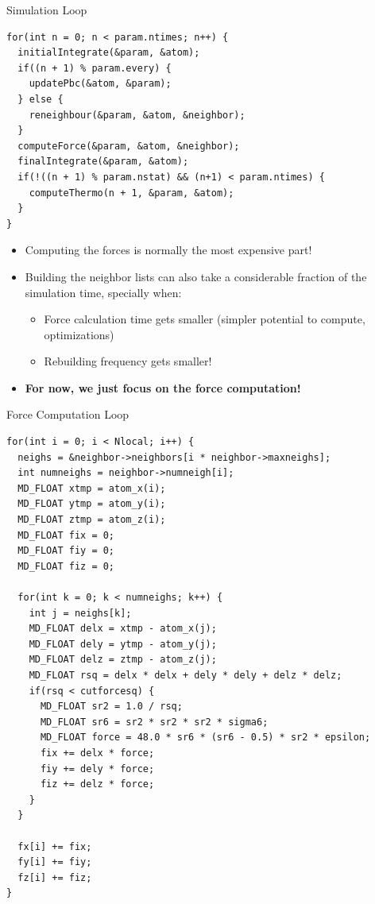 \documentclass[aspectratio=43,t]{beamer}
\begin{document}
  \begin{frame}[fragile]{Simulation Loop}
    \begin{lstlisting}
for(int n = 0; n < param.ntimes; n++) {
  initialIntegrate(&param, &atom);
  if((n + 1) % param.every) {
    updatePbc(&atom, &param);
  } else {
    reneighbour(&param, &atom, &neighbor);
  }
  computeForce(&param, &atom, &neighbor);
  finalIntegrate(&param, &atom);
  if(!((n + 1) % param.nstat) && (n+1) < param.ntimes) {
    computeThermo(n + 1, &param, &atom);
  }
}
    \end{lstlisting}
    \begin{itemize}
      \item Computing the forces is normally the most expensive part!
      \item Building the neighbor lists can also take a considerable fraction of the simulation time, specially when:
      \begin{itemize}
        \item Force calculation time gets smaller (simpler potential to compute, optimizations)
        \item Rebuilding frequency gets smaller!
      \end{itemize}
      \item \textbf{For now, we just focus on the force computation!}
    \end{itemize}
  \end{frame}

  \begin{frame}[fragile]{Force Computation Loop}
    \begin{lstlisting}[basicstyle=\tt\tiny]
for(int i = 0; i < Nlocal; i++) {
  neighs = &neighbor->neighbors[i * neighbor->maxneighs];
  int numneighs = neighbor->numneigh[i];
  MD_FLOAT xtmp = atom_x(i);
  MD_FLOAT ytmp = atom_y(i);
  MD_FLOAT ztmp = atom_z(i);
  MD_FLOAT fix = 0;
  MD_FLOAT fiy = 0;
  MD_FLOAT fiz = 0;

  for(int k = 0; k < numneighs; k++) {
    int j = neighs[k];
    MD_FLOAT delx = xtmp - atom_x(j);
    MD_FLOAT dely = ytmp - atom_y(j);
    MD_FLOAT delz = ztmp - atom_z(j);
    MD_FLOAT rsq = delx * delx + dely * dely + delz * delz;
    if(rsq < cutforcesq) {
      MD_FLOAT sr2 = 1.0 / rsq;
      MD_FLOAT sr6 = sr2 * sr2 * sr2 * sigma6;
      MD_FLOAT force = 48.0 * sr6 * (sr6 - 0.5) * sr2 * epsilon;
      fix += delx * force;
      fiy += dely * force;
      fiz += delz * force;
    }
  }

  fx[i] += fix;
  fy[i] += fiy;
  fz[i] += fiz;
}
    \end{lstlisting}
  \end{frame}
\end{document}
